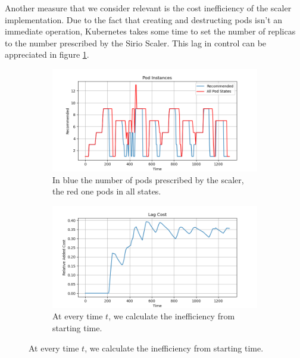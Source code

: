 Another measure that we consider relevant is the cost inefficiency of the scaler implementation. Due to the fact that creating and destructing pods isn't an immediate operation, Kubernetes takes some time to set the number of replicas to the number prescribed by the Sirio Scaler. This lag in control can be appreciated in figure \ref{fig:uniform_pods}.
\begin{figure}[H]
    \centering
    \begin{subfigure}{0.85\textwidth}
        \centering
        \includegraphics[width=\textwidth]{images/default/constant/pods.png}
        \caption{In blue the number of pods prescribed by the scaler, the red one pods in all states.}
        \label{fig:uniform_pods}
    \end{subfigure}
    \begin{subfigure}{0.85\textwidth}
        \includegraphics[width=\linewidth]{images/default/constant/lag_cost_cumulative.png}
        \caption{At every time $t$, we calculate the inefficiency from starting time.}
        \label{fig:uniform_inefficiency}
    \end{subfigure}
\end{figure}

